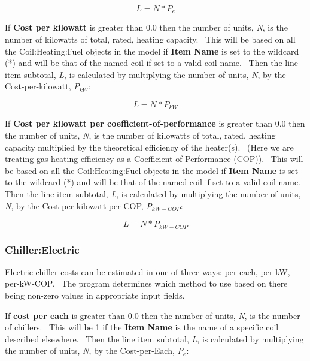\begin{equation}
L = N * {P_e}
\end{equation}

If \textbf{Cost per kilowatt} is greater than 0.0 then the number of units, \emph{N}, is the number of kilowatts of total, rated, heating capacity.~ This will be based on all the Coil:Heating:Fuel objects in the model if \textbf{Item Name} is set to the wildcard (*) and will be that of the named coil if set to a valid coil name.~ Then the line item subtotal, \emph{L}, is calculated by multiplying the number of units, \emph{N}, by the Cost-per-kilowatt, \emph{P\(_{kW}\)}:

\begin{equation}
L = N * {P_{kW}}
\end{equation}

If \textbf{Cost per kilowatt per coefficient-of-performance} is greater than 0.0 then the number of units, \emph{N}, is the number of kilowatts of total, rated, heating capacity multiplied by the theoretical efficiency of the heater(s).~ (Here we are treating gas heating efficiency as a Coefficient of Performance (COP)).~ This will be based on all the Coil:Heating:Fuel objects in the model if \textbf{Item Name} is set to the wildcard (*) and will be that of the named coil if set to a valid coil name.~ Then the line item subtotal, \emph{L}, is calculated by multiplying the number of units, \emph{N}, by the Cost-per-kilowatt-per-COP, \emph{P\(_{kW-COP}\)}:

\begin{equation}
L = N * {P_{kW - COP}}
\end{equation}

\subsubsection{Chiller:Electric}\label{chillerelectric}

Electric chiller costs can be estimated in one of three ways: per-each, per-kW, per-kW-COP.~ The program determines which method to use based on there being non-zero values in appropriate input fields.

If \textbf{cost per each} is greater than 0.0 then the number of units, \emph{N}, is the number of chillers.~ This will be 1 if the \textbf{Item Name} is the name of a specific coil described elsewhere.~ Then the line item subtotal, \emph{L}, is calculated by multiplying the number of units, \emph{N}, by the Cost-per-Each, \emph{P\(_{e}\)}:

